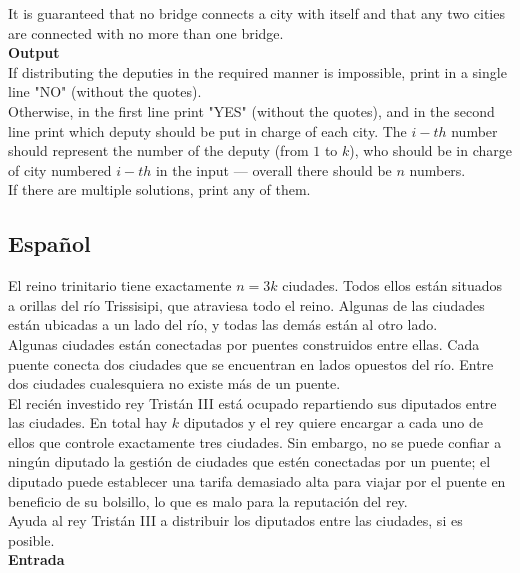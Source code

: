 \documentclass[12pt, a4paper]{article}
\begin{document}
		It is guaranteed that no bridge connects a city with itself and that any two cities are connected with no more than one bridge.\\

		{\bf Output}\\ 

		If distributing the deputies in the required manner is impossible, print in a single line "NO" (without the quotes).\\

		Otherwise, in the first line print "YES" (without the quotes), and in the second line print which deputy should be put in charge of each city. The $i-th$ number should represent the number of the deputy (from $1$ to $k$), who should be in charge of city numbered $i-th$ in the input — overall there should be $n$ numbers.\\

		If there are multiple solutions, print any of them.\\
		\newpage

	\subsection{Español}
		El reino trinitario tiene exactamente $n = 3k$ ciudades. Todos ellos están situados a orillas del río Trissisipi, que atraviesa todo el reino. Algunas de las ciudades están ubicadas a un lado del río, y todas las demás están al otro lado.\\

		Algunas ciudades están conectadas por puentes construidos entre ellas. Cada puente conecta dos ciudades que se encuentran en lados opuestos del río. Entre dos ciudades cualesquiera no existe más de un puente.\\

		El recién investido rey Tristán III está ocupado repartiendo sus diputados entre las ciudades. En total hay $k$ diputados y el rey quiere encargar a cada uno de ellos que controle exactamente tres ciudades. Sin embargo, no se puede confiar a ningún diputado la gestión de ciudades que estén conectadas por un puente; el diputado puede establecer una tarifa demasiado alta para viajar por el puente en beneficio de su bolsillo, lo que es malo para la reputación del rey.\\

		Ayuda al rey Tristán III a distribuir los diputados entre las ciudades, si es posible.\\

		{\bf Entrada}\\
\end{document}
